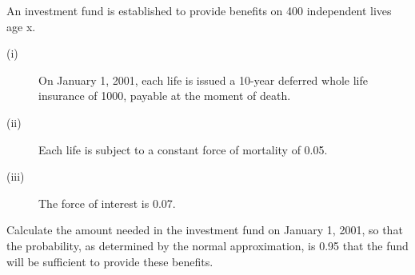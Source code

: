  An investment fund is established to provide benefits on 400 independent 
lives age x.
\begin{description}
\item[(i)] On January 1, 2001, each life is issued a 10-year deferred whole life insurance of 1000, payable at the moment of death.
\item[(ii)] Each life is subject to a constant force of mortality of 0.05.
\item[(iii)] The force of interest is 0.07.
\end{description}
Calculate the amount needed in the investment fund on January 1, 2001, so that the probability,
as determined by the normal approximation, is 0.95 that the fund will be sufficient to provide
these benefits.


